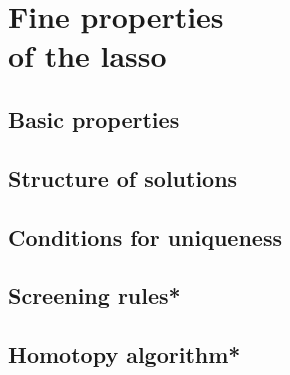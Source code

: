 \chapter{Fine properties \\ of the lasso}
\label{chap:lasso}


\section{Basic properties}

\section{Structure of solutions}
\label{sec:lasso_structure}


\section{Conditions for uniqueness}

\section{Screening rules*}

\section{Homotopy algorithm*}

